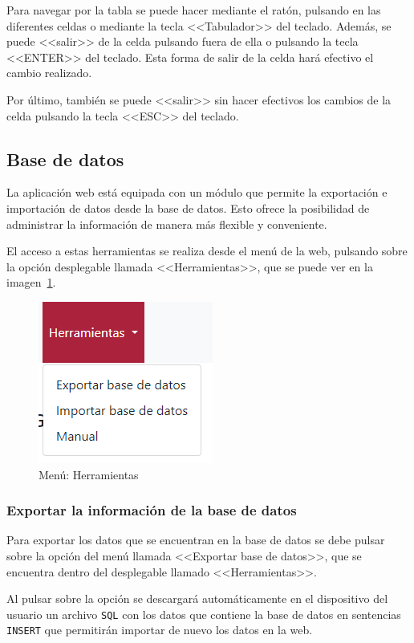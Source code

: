 Para navegar por la tabla se puede hacer mediante el ratón, pulsando en las diferentes celdas o mediante la tecla <<Tabulador>> del teclado. Además, se puede <<salir>> de la celda pulsando fuera de ella o pulsando la tecla <<ENTER>> del teclado.
Esta forma de salir de la celda hará efectivo el cambio realizado.

Por último, también se puede <<salir>> sin hacer efectivos los cambios de la celda pulsando la tecla <<ESC>> del teclado.

\subsection{Base de datos}
La aplicación web está equipada con un módulo que permite la exportación e importación de datos desde la base de datos. Esto ofrece la posibilidad de administrar la información de manera más flexible y conveniente.

El acceso a estas herramientas se realiza desde el menú de la web, pulsando sobre la opción desplegable llamada <<Herramientas>>, que se puede ver en la imagen~\ref{pag:menu herramientas}.

\begin{figure}
	\centering
	\includegraphics[width=.4\textwidth]{../img/Anexos/Manual usuario/menu herramientas.png}
	\caption{Menú: Herramientas}\label{pag:menu herramientas}
\end{figure}

\subsubsection{Exportar la información de la base de datos}
Para exportar los datos que se encuentran en la base de datos se debe pulsar sobre la opción del menú llamada <<Exportar base de datos>>, que se encuentra dentro del desplegable llamado <<Herramientas>>.

Al pulsar sobre la opción se descargará automáticamente en el dispositivo del usuario un archivo \texttt{SQL} con los datos que contiene la base de datos en sentencias \texttt{INSERT} que permitirán importar de nuevo los datos en la web.


